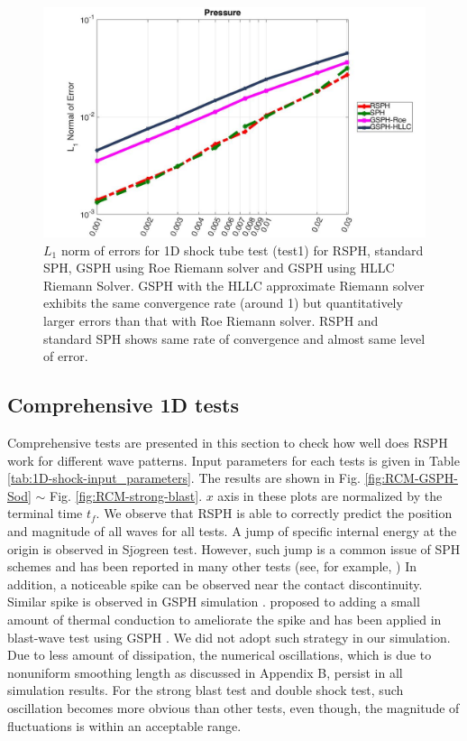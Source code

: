 \documentclass[preprint,12pt,authoryear]{elsarticle}
\begin{document}
\begin{figure}[H]
\begin{minipage}{.30 \textwidth}
    \end{minipage}%
    \begin{minipage}{.39\textwidth}
        \centering
        \includegraphics[width=0.99 \textwidth]{./Figures/Accuracy-pre}
    \end{minipage}%
    \caption{ $L_1$ norm of errors for 1D shock tube test (test1) for RSPH, standard SPH, GSPH using Roe Riemann solver and GSPH using HLLC Riemann Solver. GSPH with the HLLC approximate Riemann solver exhibits the same convergence rate (around 1) but quantitatively larger errors than that with Roe Riemann solver. RSPH and standard SPH shows same rate of convergence and almost same level of error.}
    \label{fig:Accuracy-test1}
\end{figure}
 
\subsection{Comprehensive 1D tests} \label{sec:comprehensive-1d-tests}
Comprehensive tests are presented in this section to check how well does RSPH work for different wave patterns. Input parameters for each tests is given in Table \ref{tab:1D-shock-input_parameters}.
The results are shown in Fig. \ref{fig:RCM-GSPH-Sod} $\sim$ Fig. \ref{fig:RCM-strong-blast}. $x$ axis in these plots are normalized by the terminal time $t_f$. 
We observe that RSPH is able to correctly predict the position and magnitude of all waves for all tests. A jump of specific internal energy at the origin is observed in Sj$\ddot{o}$green test. However, such jump is a common issue of SPH schemes and has been reported in many other tests (see, for example, \citep{monaghan1997sph,cha2003implementations,puri2014approximate})
In addition, a noticeable spike can be observed near the contact discontinuity. Similar spike is observed in GSPH simulation \citep{puri2014comparison}.
\citet{noh1987errors} proposed to adding a small amount of thermal conduction to ameliorate the spike and has been applied in blast-wave test using GSPH \citep{puri2014comparison}. We did not adopt such strategy in our simulation.
Due to less amount of dissipation, the numerical oscillations, which is due to nonuniform smoothing length as discussed in Appendix B, persist in all simulation results. For the strong blast test and double shock test, such oscillation becomes more obvious than other tests, even though, the magnitude of fluctuations is within an acceptable range.
\end{document}
